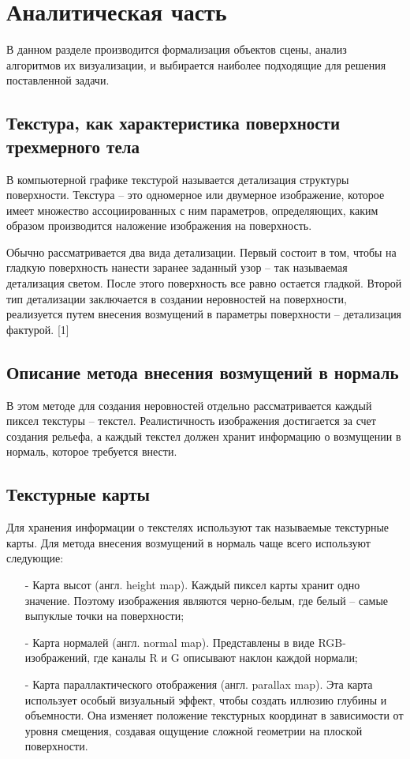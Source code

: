\chapter{Аналитическая часть}
В данном разделе производится формализация объектов сцены, анализ алгоритмов их визуализации, и выбирается наиболее подходящие для решения поставленной задачи.

\section{Текстура, как характеристика поверхности трехмерного тела}

В компьютерной графике текстурой называется детализация структуры поверхности. Текстура – это одномерное или двумерное изображение, которое имеет множество ассоциированных с ним параметров, определяющих, каким образом производится наложение изображения на поверхность.

Обычно рассматривается два вида детализации. Первый состоит в том, чтобы на гладкую поверхность нанести заранее заданный узор – так называемая детализация светом. После этого поверхность все равно остается гладкой. Второй тип детализации заключается в создании неровностей на поверхности, реализуется путем внесения возмущений в параметры поверхности – детализация фактурой. [1]

\section{Описание метода внесения возмущений в нормаль}

В этом методе для создания неровностей отдельно рассматривается каждый пиксел текстуры – текстел. Реалистичность изображения достигается за счет создания рельефа, а каждый текстел должен хранит информацию о возмущении в нормаль, которое требуется внести.

\section{Текстурные карты}

Для хранения информации о текстелях используют так называемые текстурные карты. Для метода внесения возмущений в нормаль чаще всего используют следующие:
\begin{itemize}[label=\arabic*)]
	\item[-] Карта высот (англ. height map). Каждый пиксел карты хранит одно значение. Поэтому изображения являются черно-белым, где белый – самые выпуклые точки на поверхности;
	\item[-] Карта нормалей (англ. normal map). Представлены в виде RGB-изображений, где каналы R и G описывают наклон каждой нормали;
	\item[-] Карта параллактического отображения (англ. parallax map). Эта карта использует особый визуальный эффект, чтобы создать иллюзию глубины и объемности. Она изменяет положение текстурных координат в зависимости от уровня смещения, создавая ощущение сложной геометрии на плоской поверхности.
\end{itemize}

